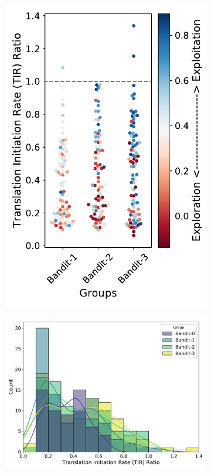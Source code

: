 \documentclass{article}
\begin{document}
\begin{figure}[!ht]
\begin{subfigure}[b]{0.25\textwidth}
    \end{subfigure}
    \begin{subfigure}[b]{0.25\textwidth}
        \centering
        \caption{}
        \includegraphics[scale=0.35]{plots/Main_Paper/swarmplot_proj.pdf}
    \end{subfigure}
    \begin{subfigure}[b]{0.48\textwidth}
        \centering
        \caption{}
        \includegraphics[scale=0.4]{plots/Main_Paper/histogram.pdf}

\end{subfigure}
\end{figure}
\end{document}
